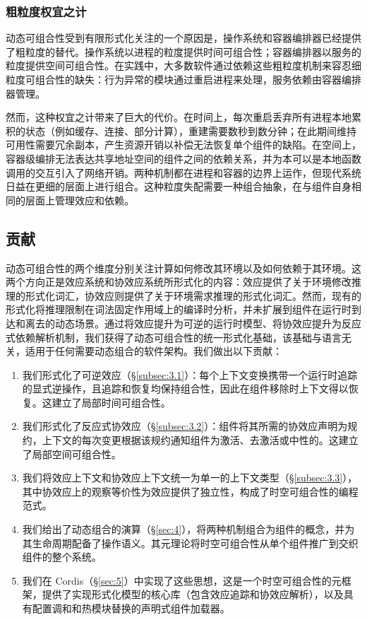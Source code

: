 \subsubsection{粗粒度权宜之计}
\label{sec:1.2.3}

动态可组合性受到有限形式化关注的一个原因是，操作系统和容器编排器已经提供了粗粒度的替代。操作系统以进程的粒度提供时间可组合性；容器编排器\cite{ref3}以服务的粒度提供空间可组合性。在实践中，大多数软件通过依赖这些粗粒度机制来容忍细粒度可组合性的缺失：行为异常的模块通过重启进程来处理，服务依赖由容器编排器管理。

然而，这种权宜之计带来了巨大的代价。在时间上，每次重启丢弃所有进程本地累积的状态（例如缓存、连接、部分计算），重建需要数秒到数分钟\cite{ref15}；在此期间维持可用性需要冗余副本，产生资源开销以补偿无法恢复单个组件的缺陷。在空间上，容器级编排无法表达共享地址空间的组件之间的依赖关系，并为本可以是本地函数调用的交互引入了网络开销。两种机制都在进程和容器的边界上运作，但现代系统日益在更细的层面上进行组合。这种粒度失配需要一种组合抽象，在与组件自身相同的层面上管理效应和依赖。

\subsection{贡献}
\label{sec:1.3}

动态可组合性的两个维度分别关注计算如何修改其环境以及如何依赖于其环境。这两个方向正是效应系统\cite{ref16,ref17}和协效应系统\cite{ref18,ref19}所形式化的内容：效应提供了关于环境修改推理的形式化词汇，协效应则提供了关于环境需求推理的形式化词汇。然而，现有的形式化将推理限制在词法固定作用域上的编译时分析，并未扩展到组件在运行时到达和离去的动态场景。通过将效应提升为可逆的运行时模型、将协效应提升为反应式依赖解析机制，我们获得了动态可组合性的统一形式化基础，该基础与语言无关，适用于任何需要动态组合的软件架构。我们做出以下贡献：

\begin{enumerate}
\item 我们形式化了可逆效应（\S\ref{subsec:3.1}）：每个上下文变换携带一个运行时追踪的显式逆操作，且追踪和恢复均保持组合性，因此在组件移除时上下文得以恢复。这建立了局部时间可组合性。
\item 我们形式化了反应式协效应（\S\ref{subsec:3.2}）：组件将其所需的协效应声明为规约，上下文的每次变更根据该规约通知组件为激活、去激活或中性的。这建立了局部空间可组合性。
\item 我们将效应上下文和协效应上下文统一为单一的上下文类型（\S\ref{subsec:3.3}），其中协效应上的观察等价性为效应提供了独立性，构成了时空可组合性的编程范式。
\item 我们给出了动态组合的演算（\S\ref{sec:4}），将两种机制组合为组件的概念，并为其生命周期配备了操作语义。其元理论将时空可组合性从单个组件推广到交织组件的整个系统。
\item 我们在 Cordis（\S\ref{sec:5}）中实现了这些思想，这是一个时空可组合性的元框架，提供了实现形式化模型的核心库（包含效应追踪和协效应解析），以及具有配置调和和热模块替换的声明式组件加载器。
\end{enumerate}
